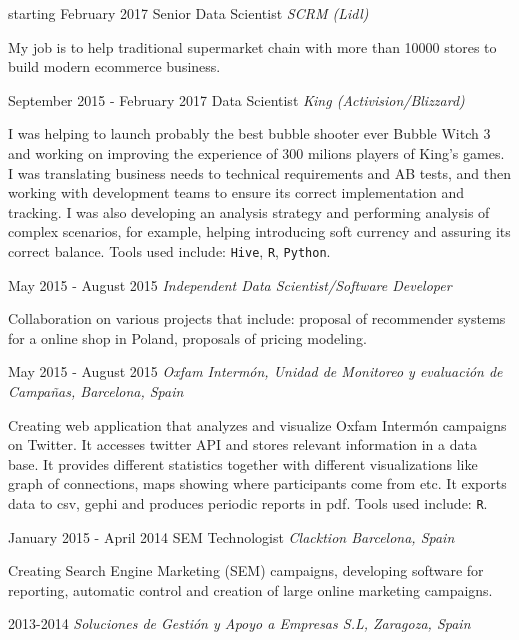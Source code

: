 \documentclass{article}
\begin{document}
\begin{CV}

\item[starting February 2017] {Senior Data Scientist \it SCRM (Lidl)}

  My job is to help traditional supermarket chain with more than
  10000 stores to build modern ecommerce business.
  
\item[September 2015 - February 2017] {Data Scientist \it King (Activision/Blizzard)}

  I was helping to launch probably the best bubble shooter ever Bubble
  Witch 3 and working on improving the experience of 300 milions
  players of King's games. I was translating business needs to
  technical requirements and AB tests, and then working with
  development teams to ensure its correct implementation and tracking.
  I was also developing an analysis strategy and performing analysis
  of complex scenarios, for example, helping introducing soft currency
  and assuring its correct balance.  Tools used include:
  \texttt{Hive}, \texttt{R}, \texttt{Python}.
  
\item[May 2015 - August 2015] {\it Independent Data Scientist/Software Developer}

  Collaboration on various projects that include: proposal of
  recommender systems for a online shop in Poland, proposals of
  pricing modeling.

\item[May 2015 - August 2015] {\it Oxfam Intermón, Unidad de
    Monitoreo y evaluación de Campañas, Barcelona, Spain}

  Creating web application that analyzes and visualize Oxfam Intermón
  campaigns on Twitter. It accesses twitter API and stores relevant
  information in a data base. It provides different
  statistics together with different
  visualizations like graph of connections, maps showing
  where participants come from etc. It exports data to csv, gephi and
  produces periodic reports in pdf.  Tools used
  include: \texttt{R}.
  
\item[January 2015 - April 2014] {SEM Technologist \it Clacktion
    Barcelona, Spain}

  Creating Search Engine Marketing (SEM) campaigns, developing
  software for reporting, automatic control and creation of large
  online marketing campaigns.
  

\item[2013-2014] {\it Soluciones de Gestión y Apoyo a Empresas S.L,
    Zaragoza, Spain}


\end{CV}
\end{document}
